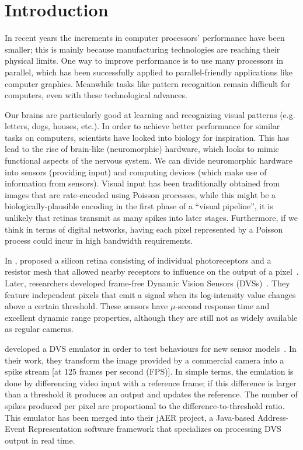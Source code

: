 \documentclass[conference]{IEEEtran}
\begin{document}
\section{Introduction}

In recent years the increments in computer processors' performance have been smaller; this is mainly because manufacturing technologies are reaching their physical limits. One way to improve performance is to use many processors in parallel, which has been successfully applied to parallel-friendly applications like computer graphics. Meanwhile tasks like pattern recognition remain difficult for computers, even with these technological advances.

Our brains are particularly good at learning and recognizing visual patterns (e.g. letters, dogs, houses, etc.). In order to achieve better performance for similar tasks on computers, scientists have looked into biology for inspiration. This has lead to the rise of brain-like (neuromorphic) hardware, which looks to mimic functional aspects of the nervous system. We can divide neuromorphic hardware into sensors (providing input) and computing devices (which make use of information from sensors). Visual input has been traditionally obtained from images that are rate-encoded using Poisson processes, while this might be a biologically-plausible encoding in the first phase of a ``visual pipeline'', it is unlikely that retinas transmit as many spikes into later stages. Furthermore, if we think in terms of digital networks, having each pixel represented by a Poisson process could incur in high bandwidth requirements. 

In \citeyear{Mead1989}, \citeauthor{Mead1989} proposed a silicon retina consisting of individual photoreceptors and a resistor mesh that allowed nearby receptors to influence on the output of a pixel~\cite{Mead1989}. 
Later, researchers developed frame-free Dynamic Vision Sensors (DVSs)~\cite{delbruckDVS,bernabeDVS}. They feature independent pixels that emit a signal when its log-intensity value changes above a certain threshold. These sensors have $\mu$-second response time and excellent dynamic range properties, although they are still not as widely available as regular cameras.

\citeauthor{DVSemu} developed a DVS emulator in order to test behaviours for new sensor models~\cite{DVSemu}. In their work, they transform the image provided by a commercial camera into a spike stream [at 125 frames per second (FPS)]. In simple terms, the emulation is done by differencing video input with a reference frame; if this difference is larger than a threshold it produces an output and updates the reference. The number of spikes produced per pixel are proportional to the difference-to-threshold ratio. This emulator has been merged into their jAER project, a Java-based Address-Event Representation software framework that specializes on processing DVS output in real time.
\end{document}
